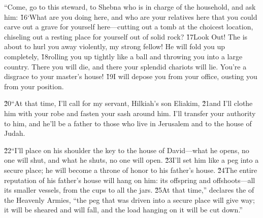 ``Come, go to this steward, to Shebna who is in charge of the household, and ask him: \v{16}`What are you doing here, and who are your relatives here that you could carve out a grave for yourself here---cutting out a tomb at the choicest location, chiseling out a resting place for yourself out of solid rock? \v{17}Look Out! The  is about to hurl you away violently, my strong fellow! He will fold you up completely, \v{18}rolling you up tightly like a ball and throwing you into a large country. There you will die, and there your splendid chariots will lie. You're a disgrace to your master's house! \v{19}I will depose you from your office, ousting you from your position.

\v{20}``At that time, I'll call for my servant, Hilkiah's son Eliakim, \v{21}and I'll clothe him with your robe and fasten your sash around him. I'll transfer your authority to him, and he'll be a father to those who live in Jerusalem and to the house of Judah.

\v{22}``I'll place on his shoulder the key to the house of David---what he opens, no one will shut, and what he shuts, no one will open. \v{23}I'll set him like a peg into a secure place; he will become a throne of honor to his father's house. \v{24}The entire reputation of his father's house will hang on him: its offspring and offshoots---all its smaller vessels, from the cups to all the jars. \v{25}At that time,'' declares the  of the Heavenly Armies, ``the peg that was driven into a secure place will give way; it will be sheared and will fall, and the load hanging on it will be cut down.''

